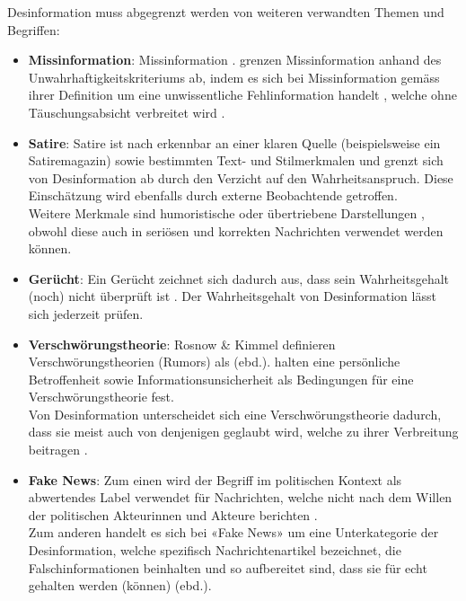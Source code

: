 \documentclass[12pt,a4paper]{article}        %
\begin{document}
Desinformation muss abgegrenzt werden von weiteren verwandten Themen und Begriffen:
\begin{itemize}
  \item \textbf{Missinformation}: Missinformation  \parencite[2]{bontridder_role_2021}. \citeauthor{marx_fake_2020} grenzen Missinformation anhand des Unwahrhaftigkeitskriteriums ab, indem es sich bei Missinformation gemäss ihrer Definition um eine unwissentliche Fehlinformation handelt \parencite[156]{marx_fake_2020}, welche ohne Täuschungsabsicht verbreitet wird \parencite[vgl.\ auch][15]{grujic_warnhinweise_2024}.
  \item \textbf{Satire}: Satire ist nach \textcite[154]{marx_fake_2020} erkennbar an einer klaren Quelle (beispielsweise ein Satiremagazin) sowie bestimmten Text- und Stilmerkmalen und grenzt sich von Desinformation ab durch den Verzicht auf den Wahrheitsanspruch. Diese Einschätzung wird ebenfalls durch externe Beobachtende getroffen.\\
    Weitere Merkmale sind humoristische oder übertriebene Darstellungen \parencites[141]{tandoc_jr_defining_2018}[2]{khan_fake_2021}, obwohl diese auch in seriösen und korrekten Nachrichten verwendet werden können.
  \item \textbf{Gerücht}: Ein Gerücht zeichnet sich dadurch aus, dass sein Wahrheitsgehalt (noch) nicht überprüft ist \parencite[155]{marx_fake_2020}. Der Wahrheitsgehalt von Desinformation lässt sich jederzeit prüfen.
  \item \textbf{Verschwörungstheorie}: Rosnow \& Kimmel \parencite[zit.\ nach][197]{krafft_disinformation_2020} definieren Verschwörungstheorien (Rumors) als  (ebd.). \textcite[197]{krafft_disinformation_2020} halten eine persönliche Betroffenheit sowie Informationsunsicherheit als Bedingungen für eine Verschwörungstheorie fest.\\
    Von Desinformation unterscheidet sich eine Verschwörungstheorie dadurch, dass sie meist auch von denjenigen geglaubt wird, welche zu ihrer Verbreitung beitragen \parencite[156]{marx_fake_2020}.
  \item \textbf{Fake News}: Zum einen wird der Begriff im politischen Kontext als abwertendes Label verwendet für Nachrichten, welche nicht nach dem Willen der politischen Akteurinnen und Akteure berichten \parencite[3]{tandoc_jr_facts_2019}.\\
    Zum anderen handelt es sich bei «Fake News» um eine Unterkategorie der Desinformation, welche spezifisch Nachrichtenartikel bezeichnet, die Falschinformationen beinhalten und so aufbereitet sind, dass sie für echt gehalten werden (können) (ebd.).
\end{itemize}
\end{document}
